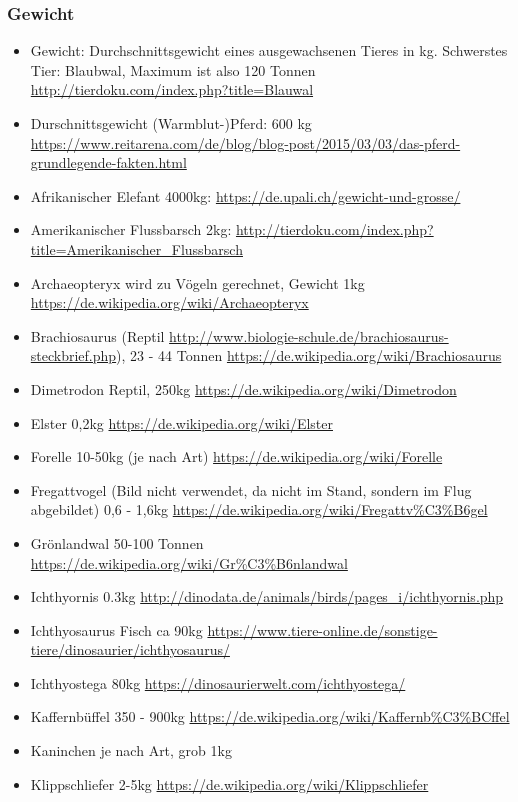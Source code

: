  \subsubsection{Gewicht}
 \begin{itemize}
  \item Gewicht: Durchschnittsgewicht eines ausgewachsenen Tieres in kg. Schwerstes Tier: Blaubwal, Maximum ist also 120 Tonnen \url{http://tierdoku.com/index.php?title=Blauwal}
  \item Durschnittsgewicht (Warmblut-)Pferd: 600 kg \url{https://www.reitarena.com/de/blog/blog-post/2015/03/03/das-pferd-grundlegende-fakten.html}
  \item Afrikanischer Elefant 4000kg: \url{https://de.upali.ch/gewicht-und-grosse/}
  \item Amerikanischer Flussbarsch 2kg: \url{http://tierdoku.com/index.php?title=Amerikanischer_Flussbarsch}
  \item Archaeopteryx wird zu Vögeln gerechnet, Gewicht 1kg \url{https://de.wikipedia.org/wiki/Archaeopteryx}
  \item Brachiosaurus (Reptil \url{http://www.biologie-schule.de/brachiosaurus-steckbrief.php}), 23 - 44 Tonnen \url{https://de.wikipedia.org/wiki/Brachiosaurus}
  \item Dimetrodon Reptil, 250kg \url{https://de.wikipedia.org/wiki/Dimetrodon}
  \item Elster 0,2kg \url{https://de.wikipedia.org/wiki/Elster}
  \item Forelle 10-50kg (je nach Art) \url{https://de.wikipedia.org/wiki/Forelle}
  \item Fregattvogel (Bild nicht verwendet, da nicht im Stand, sondern im Flug abgebildet) 0,6 - 1,6kg \url{https://de.wikipedia.org/wiki/Fregattv\%C3\%B6gel}
  \item Grönlandwal 50-100 Tonnen \url{https://de.wikipedia.org/wiki/Gr\%C3\%B6nlandwal}
  \item Ichthyornis 0.3kg \url{http://dinodata.de/animals/birds/pages_i/ichthyornis.php}
  \item Ichthyosaurus Fisch ca 90kg \url{https://www.tiere-online.de/sonstige-tiere/dinosaurier/ichthyosaurus/}
  \item Ichthyostega 80kg \url{https://dinosaurierwelt.com/ichthyostega/}
  \item Kaffernbüffel 350 - 900kg \url{https://de.wikipedia.org/wiki/Kaffernb\%C3\%BCffel}
  \item Kaninchen je nach Art, grob 1kg
  \item Klippschliefer 2-5kg \url{https://de.wikipedia.org/wiki/Klippschliefer}

\end{itemize}
